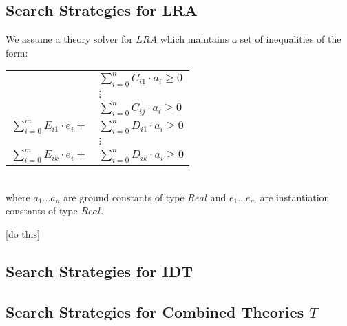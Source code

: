 \documentclass{llncs}
\begin{document}
\begin{comment}
The following example shows use of this theorem:

{\bf Example 6}
Say we wish to determine the satisfiability of the set of formulas $S = \{ a \neq b, f( a ) \neq d, (\psi :) \forall \bar{x}. (x = b \Rightarrow f( x ) = d) \}$.
After applying Unit propagation, applying Decide for $\bot^{\neg \psi}$, applying Counterexample $\forall$-Inst, after unit propagation we arrive in the DPLL(T) state $a \neq b, f( a ) \neq d, \neg( \bot^{\neg \psi} )^d, e = b, f( e ) \neq d \parallel S$.
Note that $f( e )$ is disequality combatible since $e \neq a$.
Therefore, by our theorem, $S$ is a satisifiable. \\
\end{comment}

\subsection{Search Strategies for LRA}

We assume a theory solver for $LRA$ which maintains a set of inequalities of the form:

\begin{tabular}{rl}
 & $\displaystyle\sum\limits_{i=0}^n C_{i1} \cdot a_i \geq 0$ \\
 & $\vdots$ \\
 & $\displaystyle\sum\limits_{i=0}^n C_{ij} \cdot a_i \geq 0$ \\
 $\displaystyle\sum\limits_{i=0}^m E_{i1} \cdot e_i +$ & $\displaystyle\sum\limits_{i=0}^n D_{i1} \cdot a_i \geq 0$ \\
 & $\vdots$ \\
 $\displaystyle\sum\limits_{i=0}^m E_{ik} \cdot e_i +$ & $\displaystyle\sum\limits_{i=0}^n D_{ik} \cdot a_i \geq 0$ \\
 \end{tabular} \\

where $a_1 \ldots a_n$ are ground constants of type $Real$ and $e_1 \ldots e_m$ are instantiation constants of type $Real$.

[do this]

\subsection{Search Strategies for IDT}

\subsection{Search Strategies for Combined Theories $T$}
\end{document}
